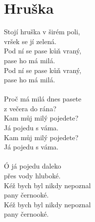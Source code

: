 \section{Hruška}
Stojí hruška v širém poli,\\
vršek se jí zelená.\\
Pod ní se pase kůň vraný,\\
pase ho má milá.\\
Pod ní se pase kůň vraný,\\
pase ho má milá.\\
\\
Proč má milá dnes pasete\\
z večera do rána?\\
Kam můj milý pojedete?\\
Já pojedu s váma.\\
Kam můj milý pojedete?\\
Já pojedu s váma.\\
\\
Ó já pojedu daleko\\
přes vody hluboké.\\
Kéž bych byl nikdy nepoznal\\
pany černooké.\\
Kéž bych byl nikdy nepoznal\\
pany černooké.\\
